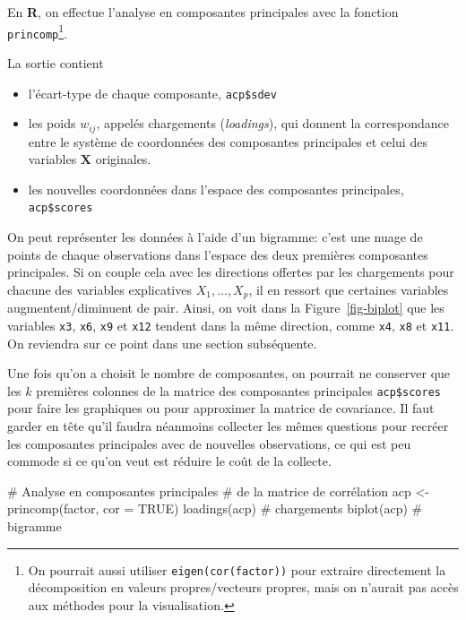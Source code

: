 \documentclass[
  11pt,
  letterpaper,
]{book}
\newenvironment{Shaded}{\begin{snugshade}}{\end{snugshade}}
\newcommand{\AttributeTok}[1]{\textcolor[rgb]{0.40,0.45,0.13}{#1}}
\newcommand{\CommentTok}[1]{\textcolor[rgb]{0.37,0.37,0.37}{#1}}
\newcommand{\ConstantTok}[1]{\textcolor[rgb]{0.56,0.35,0.01}{#1}}
\newcommand{\FunctionTok}[1]{\textcolor[rgb]{0.28,0.35,0.67}{#1}}
\newcommand{\NormalTok}[1]{\textcolor[rgb]{0.00,0.23,0.31}{#1}}
\newcommand{\OtherTok}[1]{\textcolor[rgb]{0.00,0.23,0.31}{#1}}
\providecommand{\tightlist}{%
  \setlength{\itemsep}{0pt}\setlength{\parskip}{0pt}}\usepackage{longtable,booktabs,array}
\theoremstyle{definition}
\theoremstyle{remark}
\begin{document}
En \textbf{R}, on effectue l'analyse en composantes principales avec la
fonction \texttt{princomp}\footnote{On pourrait aussi utiliser
  \texttt{eigen(cor(factor))} pour extraire directement la décomposition
  en valeurs propres/vecteurs propres, mais on n'aurait pas accès aux
  méthodes pour la visualisation.}.

La sortie contient

\begin{itemize}
\tightlist
\item
  l'écart-type de chaque composante, \texttt{acp\$sdev}
\item
  les poids \(w_{ij}\), appelés chargements (\emph{loadings}), qui
  donnent la correspondance entre le système de coordonnées des
  composantes principales et celui des variables \(\boldsymbol{X}\)
  originales.
\item
  les nouvelles coordonnées dans l'espace des composantes principales,
  \texttt{acp\$scores}
\end{itemize}

On peut représenter les données à l'aide d'un bigramme: c'est une nuage
de points de chaque observations dans l'espace des deux premières
composantes principales. Si on couple cela avec les directions offertes
par les chargements pour chacune des variables explicatives
\(X_1, \ldots, X_p\), il en ressort que certaines variables
augmentent/diminuent de pair. Ainsi, on voit dans la
Figure~\ref{fig-biplot} que les variables \texttt{x3}, \texttt{x6},
\texttt{x9} et \texttt{x12} tendent dans la même direction, comme
\texttt{x4}, \texttt{x8} et \texttt{x11}. On reviendra sur ce point dans
une section subséquente.

Une fois qu'on a choisit le nombre de composantes, on pourrait ne
conserver que les \(k\) premières colonnes de la matrice des composantes
principales \texttt{acp\$scores} pour faire les graphiques ou pour
approximer la matrice de covariance. Il faut garder en tête qu'il faudra
néanmoins collecter les mêmes questions pour recréer les composantes
principales avec de nouvelles observations, ce qui est peu commode si ce
qu'on veut est réduire le coût de la collecte.

\begin{Shaded}
\begin{Highlighting}[]
\CommentTok{\# Analyse en composantes principales}
\CommentTok{\# de la matrice de corrélation}
\NormalTok{acp }\OtherTok{\textless{}{-}} \FunctionTok{princomp}\NormalTok{(factor, }\AttributeTok{cor =} \ConstantTok{TRUE}\NormalTok{)}
\FunctionTok{loadings}\NormalTok{(acp) }\CommentTok{\# chargements}
\FunctionTok{biplot}\NormalTok{(acp) }\CommentTok{\# bigramme}
\end{Highlighting}
\end{Shaded}
\end{document}

